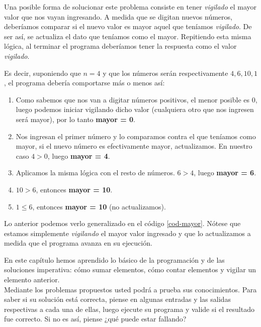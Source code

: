 Una posible forma de solucionar este problema consiste  en  tener \emph{vigilado} el mayor valor que nos vayan ingresando. A medida que se digitan nuevos números, deberíamos comparar si el nuevo valor es mayor aquel que teníamos \emph{vigilado}. De ser así, se actualiza el dato que teníamos como el mayor. Repitiendo esta misma lógica, al terminar el programa deberíamos tener la respuesta como el valor \emph{vigilado}.

Es decir, suponiendo que $n = 4$ y que los números serán respectivamente $4, 6, 10, 1$, el programa debería comportarse más o menos así:

\begin{enumerate}
\item Como sabemos que nos van a digitar números positivos, el menor posible es 0, luego podemos iniciar vigilando dicho valor (cualquiera otro que nos ingresen será mayor), por lo tanto \textbf{mayor = 0}.
\item Nos ingresan el primer número y lo comparamos contra el que teníamos como mayor, si el nuevo número es efectivamente mayor, actualizamos. En nuestro caso $4 > 0$, luego \textbf{mayor = 4}.
\item Aplicamos la misma lógica con el resto de números. $6 > 4$, luego \textbf{mayor = 6}.
\item $10 > 6$, entonces \textbf{mayor = 10}.
\item $1 \leq 6$, entonces \textbf{mayor = 10} (no actualizamos).
\end{enumerate}

Lo anterior podemos verlo generalizado en el código \ref{cod-mayor}. Nótese que estamos simplemente \emph{vigilando} el mayor valor ingresado y que lo actualizamos a medida que el programa avanza en su ejecución. \\

 

\newpage

En este capítulo hemos aprendido lo básico de la programación y de las soluciones imperativa: cómo sumar elementos, cómo contar elementos y vigilar un elemento anterior. \\

Mediante los problemas propuestos usted podrá a prueba sus conocimientos. Para saber si su solución está correcta, piense en algunas entradas y las salidas respectivas a cada una de ellas, luego ejecute su programa y valide si el resultado fue correcto. Si no es así, piense ¿qué puede estar fallando?

